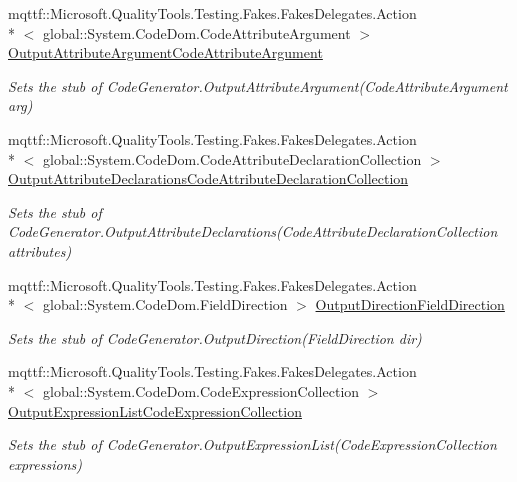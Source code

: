 \begin{DoxyCompactItemize}
mqttf\-::\-Microsoft.\-Quality\-Tools.\-Testing.\-Fakes.\-Fakes\-Delegates.\-Action\\*
$<$ global\-::\-System.\-Code\-Dom.\-Code\-Attribute\-Argument $>$ \hyperlink{class_system_1_1_code_dom_1_1_compiler_1_1_fakes_1_1_stub_code_generator_ace589aa3cc8ecded557546e7cac75206}{Output\-Attribute\-Argument\-Code\-Attribute\-Argument}
\begin{DoxyCompactList}\small\item\em Sets the stub of Code\-Generator.\-Output\-Attribute\-Argument(\-Code\-Attribute\-Argument arg)\end{DoxyCompactList}\item 
mqttf\-::\-Microsoft.\-Quality\-Tools.\-Testing.\-Fakes.\-Fakes\-Delegates.\-Action\\*
$<$ global\-::\-System.\-Code\-Dom.\-Code\-Attribute\-Declaration\-Collection $>$ \hyperlink{class_system_1_1_code_dom_1_1_compiler_1_1_fakes_1_1_stub_code_generator_a1fdb8ead487aa5937b5a241324fd76b1}{Output\-Attribute\-Declarations\-Code\-Attribute\-Declaration\-Collection}
\begin{DoxyCompactList}\small\item\em Sets the stub of Code\-Generator.\-Output\-Attribute\-Declarations(\-Code\-Attribute\-Declaration\-Collection attributes)\end{DoxyCompactList}\item 
mqttf\-::\-Microsoft.\-Quality\-Tools.\-Testing.\-Fakes.\-Fakes\-Delegates.\-Action\\*
$<$ global\-::\-System.\-Code\-Dom.\-Field\-Direction $>$ \hyperlink{class_system_1_1_code_dom_1_1_compiler_1_1_fakes_1_1_stub_code_generator_a2e4d4e380c340132b79d51098ffdd51a}{Output\-Direction\-Field\-Direction}
\begin{DoxyCompactList}\small\item\em Sets the stub of Code\-Generator.\-Output\-Direction(\-Field\-Direction dir)\end{DoxyCompactList}\item 
mqttf\-::\-Microsoft.\-Quality\-Tools.\-Testing.\-Fakes.\-Fakes\-Delegates.\-Action\\*
$<$ global\-::\-System.\-Code\-Dom.\-Code\-Expression\-Collection $>$ \hyperlink{class_system_1_1_code_dom_1_1_compiler_1_1_fakes_1_1_stub_code_generator_a637566276486473b181da28835155355}{Output\-Expression\-List\-Code\-Expression\-Collection}
\begin{DoxyCompactList}\small\item\em Sets the stub of Code\-Generator.\-Output\-Expression\-List(\-Code\-Expression\-Collection expressions)\end{DoxyCompactList}\item 

\end{DoxyCompactItemize}
